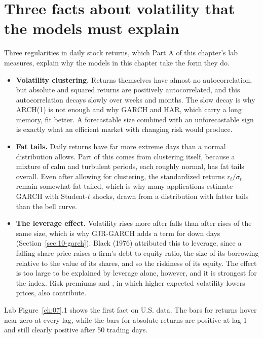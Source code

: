 \section[Three facts about volatility]{Three facts about volatility that the models must explain}
\label{sec:10-how}

Three regularities in daily stock returns, which Part A of this chapter's lab measures, explain why the models in this chapter take the form they do.

\begin{itemize}
  \item \textbf{Volatility clustering.} Returns themselves have almost no autocorrelation, but absolute and squared returns are positively autocorrelated, and this autocorrelation decays slowly over weeks and months. The slow decay is why ARCH(1) is not enough and why GARCH and HAR, which carry a long memory, fit better. A forecastable size combined with an unforecastable sign is exactly what an efficient market with changing risk would produce.
  \item \textbf{Fat tails.} Daily returns have far more extreme days than a normal distribution allows. Part of this comes from clustering itself, because a mixture of calm and turbulent periods, each roughly normal, has fat tails overall. Even after allowing for clustering, the standardized returns $r_t / \sigma_t$ remain somewhat fat-tailed, which is why many applications estimate GARCH with Student-$t$ shocks, drawn from a distribution with fatter tails than the bell curve.
  \item \textbf{The leverage effect.} Volatility rises more after falls than after rises of the same size, which is why GJR-GARCH adds a term for down days (Section~\ref{sec:10-garch}). Black (1976) attributed this to leverage, since a falling share price raises a firm's debt-to-equity ratio, the size of its borrowing relative to the value of its shares, and so the riskiness of its equity. The effect is too large to be explained by leverage alone, however, and it is strongest for the index. Risk premiums and , in which higher expected volatility lowers prices, also contribute.
\end{itemize}

Lab Figure~\ref{ch:07}.1 shows the first fact on U.S. data. The bars for returns hover near zero at every lag, while the bars for absolute returns are positive at lag 1 and still clearly positive after 50 trading days.


